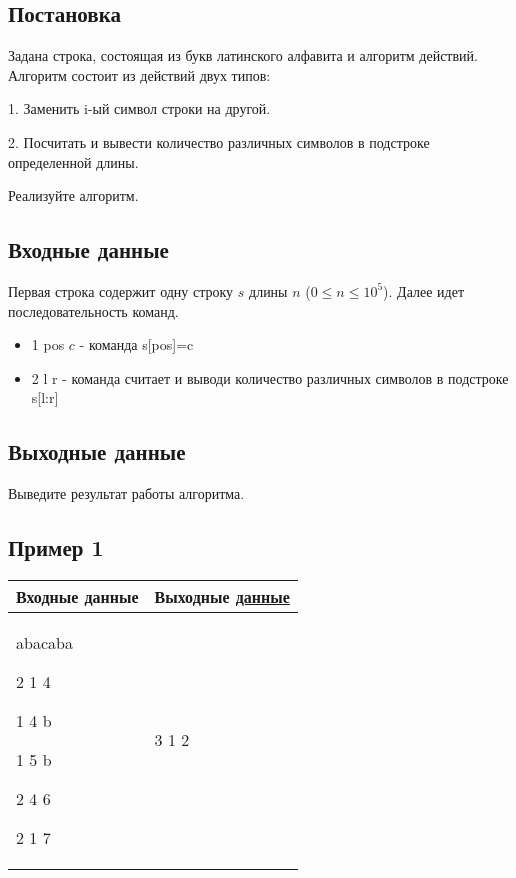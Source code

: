 \documentclass[a4]{article}
\begin{document}
\subsection*{Постановка}
\label{sec:orga2b5149}
Задана строка, состоящая из букв латинского алфавита и алгоритм действий. Алгоритм состоит из действий двух типов:

1. Заменить i-ый символ строки на другой.

2. Посчитать и вывести количество различных символов в подстроке определенной длины.

Реализуйте алгоритм.
\subsection*{Входные данные}
\label{sec:orgeb4908d}
Первая строка содержит одну строку $s$ длины $n$ ($0\leq n \leq 10^5$).
Далее идет последовательность команд.
\begin{itemize}
    \item 1 pos $c$ - команда s[pos]=c
    \item 2 l r - команда считает и выводи количество различных символов в подстроке s[l:r]
\end{itemize}

\subsection*{Выходные данные}
\label{sec:orged795e8}
Выведите результат работы алгоритма.
\subsection*{Пример 1}
\label{sec:org6a26c04}

\begin{table}[H]
\begin{center}
\begin{tabular}{|m{4cm}|m{4cm}|}
\hline
Входные данные & Выходные \href{https://youtu.be/dQw4w9WgXcQ}{данные} \\ \hline
abacaba

2 1 4

1 4 b

1 5 b

2 4 6

2 1 7
&
3 1 2
\\ \hline
\end{tabular}
\end{center}
\end{table}
\pagebreak
\end{document}
